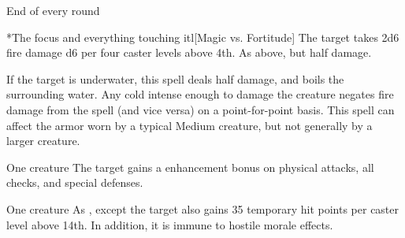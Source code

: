 \begin{spellheader}
    \spellrng{\rngmed}
    \spelldur{\durshort \dismissable}
\end{spellheader}
\begin{spelleffects}
    \begin{spelltrigger}{End of every round}
        \begin{spelltargets}*{The focus and everything touching it}l[Magic vs. Fortitude]
            \spellsuccess The target takes 2d6 fire damage \add d6 per four caster levels above 4th.
            \spellfailure As above, but half damage.
        \end{spelltargets}
    \end{spelltrigger}
\end{spelleffects}
\begin{spellfooter}
    \spellnotes If the target is underwater, this spell deals half damage, and boils the surrounding water. Any cold intense enough to damage the creature negates fire damage from the spell (and vice versa) on a point-for-point basis. This spell can affect the armor worn by a typical Medium creature, but not generally by a larger creature.
\end{spellfooter}

\begin{spellheader}
    \spellrng{\rngclose}
    \spelldur{\durshort \dismissable}
\end{spellheader}
\begin{spelleffects}
    \begin{spelltarget}{One creature}
        \spelleffect The target gains a  enhancement bonus on physical attacks, all checks, and special defenses. \spellbonusscalingdescription
    \end{spelltarget}
\end{spelleffects}

\begin{spellheader}
    \spellrng{\rngclose}
    \spelldur{\durshort \dismissable}
\end{spellheader}
\begin{spelleffects}
    \begin{spelltarget}{One creature}
        \spelleffect As , except the target also gains 35 temporary hit points  per caster level above 14th. In addition, it is immune to hostile morale effects.
    \end{spelltarget}
\end{spelleffects}

